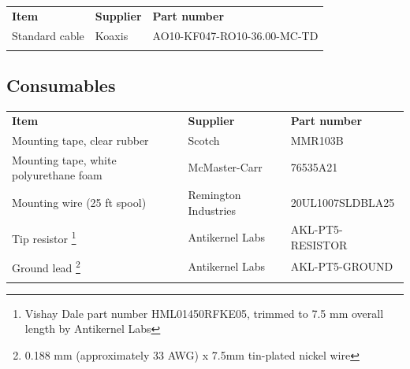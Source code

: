 \documentclass[11pt]{article}
\newcommand{\thinhline}{\Xhline{1\arrayrulewidth}}
\newcommand{\thickhline}{\Xhline{2.5\arrayrulewidth}}
\begin{document}
\begin{tabularx}{16cm}{llX}
\thickhline
\textbf{Item} & \textbf{Supplier} & \textbf{Part number} \\
\thickhline
Standard cable & Koaxis & AO10-KF047-RO10-36.00-MC-TD \\
\thickhline
\end{tabularx}

\subsection{Consumables}

\begin{tabularx}{16cm}{llX}
\thickhline
\textbf{Item} & \textbf{Supplier} & \textbf{Part number} \\
\thickhline
Mounting tape, clear rubber & Scotch & MMR103B \\
\thinhline
Mounting tape, white polyurethane foam & McMaster-Carr & 76535A21 \\
\thinhline
Mounting wire (25 ft spool) & Remington Industries & 20UL1007SLDBLA25 \\
\thinhline
Tip resistor \footnote{Vishay Dale part number HML01450RFKE05, trimmed to 7.5 mm overall length by Antikernel Labs}
	& Antikernel Labs & AKL-PT5-RESISTOR \\
\thinhline
Ground lead \footnote{0.188 mm (approximately 33 AWG) x 7.5mm tin-plated nickel wire} & Antikernel Labs & AKL-PT5-GROUND \\
\thickhline
\end{tabularx}
\end{document}

